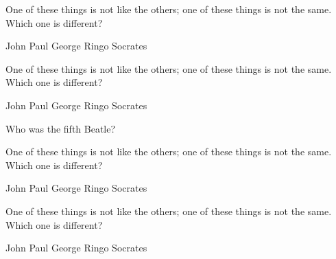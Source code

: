 \begin{questions}
    \question One of these things is not like the others; one of these things is not the same. Which one is different?\par
    \begin{oneparchoices}
        \choice John
        \choice Paul
        \choice George
        \choice Ringo
        \CorrectChoice Socrates
    \end{oneparchoices}
    \answerline[]

    \question One of these things is not like the others; one of these things is not the same. Which one is different?\par
    \begin{choices}
        \choice John
        \choice Paul
        \choice George
        \choice Ringo
        \CorrectChoice Socrates
    \end{choices}
    \answerline

    \question Who was the fifth Beatle?

    \question One of these things is not like the others; one of these things is not the same. Which one is different?\par
    \begin{checkboxes}
        \choice John
        \choice Paul
        \choice George
        \choice Ringo
        \CorrectChoice Socrates
    \end{checkboxes}

    \question One of these things is not like the others; one of these things is not the same. Which one is different?\par
    \begin{oneparcheckboxes}
        \choice John
        \choice Paul
        \choice George
        \choice Ringo
        \CorrectChoice Socrates
    \end{oneparcheckboxes}
\end{questions}
